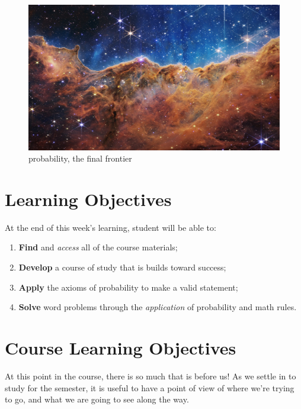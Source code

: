 \documentclass[
]{book}
\providecommand{\tightlist}{%
  \setlength{\itemsep}{0pt}\setlength{\parskip}{0pt}}
\theoremstyle{definition}
\theoremstyle{definition}
\theoremstyle{definition}
\theoremstyle{definition}
\theoremstyle{remark}
\begin{document}
\begin{figure}
\centering
\includegraphics{./images/webb.jpg}
\caption{probability, the final frontier}
\end{figure}

\hypertarget{learning-objectives}{%
\section{Learning Objectives}\label{learning-objectives}}

At the end of this week's learning, student will be able to:

\begin{enumerate}
\def\labelenumi{\arabic{enumi}.}
\tightlist
\item
  \textbf{Find} and \emph{access} all of the course materials;
\item
  \textbf{Develop} a course of study that is builds toward success;
\item
  \textbf{Apply} the axioms of probability to make a valid statement;
\item
  \textbf{Solve} word problems through the \emph{application} of probability and math rules.
\end{enumerate}

\hypertarget{course-learning-objectives}{%
\section{Course Learning Objectives}\label{course-learning-objectives}}

At this point in the course, there is so much that is before us! As we settle in to study for the semester, it is useful to have a point of view of where we're trying to go, and what we are going to see along the way.
\end{document}
